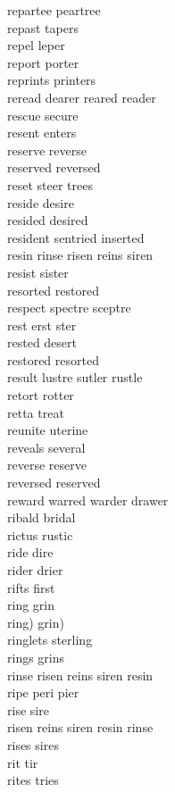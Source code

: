 repartee peartree\\
repast tapers\\
repel leper\\
report porter\\
reprints printers\\
reread dearer reared reader\\
rescue secure\\
resent enters\\
reserve reverse\\
reserved reversed\\
reset steer trees\\
reside desire\\
resided desired\\
resident sentried inserted\\
resin rinse risen reins siren\\
resist sister\\
resorted restored\\
respect spectre sceptre\\
rest erst ster\\
rested desert\\
restored resorted\\
result lustre sutler rustle\\
retort rotter\\
retta treat\\
reunite uterine\\
reveals several\\
reverse reserve\\
reversed reserved\\
reward warred warder drawer\\
ribald bridal\\
rictus rustic\\
ride dire\\
rider drier\\
rifts first\\
ring grin\\
ring) grin)\\
ringlets sterling\\
rings grins\\
rinse risen reins siren resin\\
ripe peri pier\\
rise sire\\
risen reins siren resin rinse\\
rises sires\\
rit tir\\
rites tries\\
